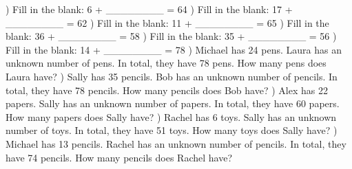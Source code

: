 \documentclass{article}%
\begin{document}
\newline%
) Fill in the blank: 6 + \_\_\_\_\_\_\_\_ = 64%
\newline%
\newline%
) Fill in the blank: 17 + \_\_\_\_\_\_\_\_ = 62%
\newline%
\newline%
) Fill in the blank: 11 + \_\_\_\_\_\_\_\_ = 65%
\newline%
\newline%
) Fill in the blank: 36 + \_\_\_\_\_\_\_\_ = 58%
\newline%
\newline%
) Fill in the blank: 35 + \_\_\_\_\_\_\_\_ = 56%
\newline%
\newline%
) Fill in the blank: 14 + \_\_\_\_\_\_\_\_ = 78%
\newline%
\newline%
) Michael has 24 pens. Laura has an unknown number of pens. In total, they have 78 pens. How many pens does Laura have?%
\newline%
\newline%
) Sally has 35 pencils. Bob has an unknown number of pencils. In total, they have 78 pencils. How many pencils does Bob have?%
\newline%
\newline%
) Alex has 22 papers. Sally has an unknown number of papers. In total, they have 60 papers. How many papers does Sally have?%
\newline%
\newline%
) Rachel has 6 toys. Sally has an unknown number of toys. In total, they have 51 toys. How many toys does Sally have?%
\newline%
\newline%
) Michael has 13 pencils. Rachel has an unknown number of pencils. In total, they have 74 pencils. How many pencils does Rachel have?%
\newline%
\newline%
\end{document}
